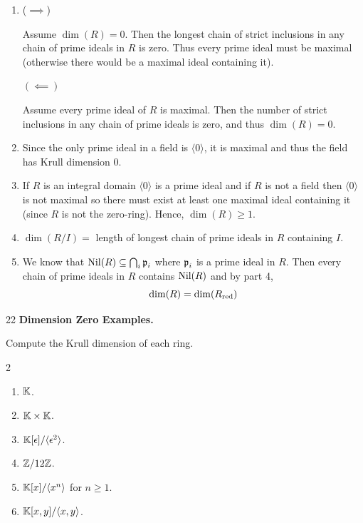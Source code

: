 \documentclass[Notebook.tex]{subfiles}
\begin{document}
\begin{solution}
    \bbni
    \begin{enumerate}
        \item ($\implies$) 
        
        Assume $\dim(R) = 0$. Then the longest chain of strict inclusions in any chain of prime ideals in $R$ is zero. Thus every prime ideal must be maximal (otherwise there would be a maximal ideal containing it). 

        $(\impliedby)$ 

        Assume every prime ideal of $R$ is maximal. Then the number of strict inclusions in any chain of prime ideals is zero, and thus $\dim(R) = 0$.
        
        \item Since the only prime ideal in a field is $\langle 0 \rangle$, it is maximal and thus the field has Krull dimension $0$.
        
        \item If $R$ is an integral domain $\langle 0 \rangle$ is a prime ideal and if $R$ is not a field then $\langle 0 \rangle$ is not maximal so there must exist at least one maximal ideal containing it (since $R$ is not the zero-ring). Hence, $\dim(R) \geq 1$. 
        
        \item $\dim(R/I) = $ length of longest chain of prime ideals in $R$ containing $I$. 
        
        \item We know that $\text{Nil}(R) \subseteq \bigcap_i \operatorname{\mathfrak{p}}_i$ where $\operatorname{\mathfrak{p}}_i$ is a prime ideal in $R$. Then every chain of prime ideals in $R$ contains $\text{Nil}(R)$ and by part 4, 
        \[\dim(R) = \dim(R_{\text{red}})\]
    \end{enumerate}
\end{solution}

\newpage 

\begin{problem}{22} 
    \textbf{Dimension Zero Examples.} 
    
    Compute the Krull dimension of each ring.
    \begin{multicols}{2}
    \begin{enumerate}
        \item $\mathbb K$.
        \item $\mathbb K\times \mathbb K$.
        \item $\mathbb K[\epsilon]/\langle \epsilon^2\rangle$.
        \item $\mathbb Z/12\mathbb Z$.
        \item $\mathbb K[x]/\langle x^n\rangle$ for $n\geq 1$.
        \item $\mathbb K[x,y]/\langle x,y\rangle$.
    \end{enumerate}
    \end{multicols}
\end{problem}
\end{document}
